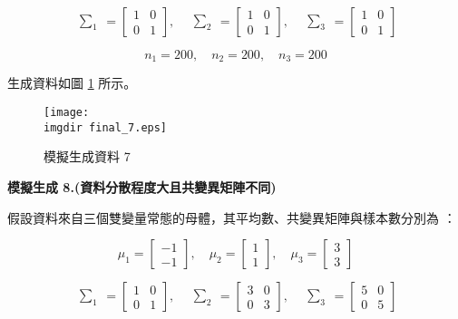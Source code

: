 \[\begin{matrix} \sum_{1} \end{matrix} = \begin{bmatrix}
1 & 0\\
0 & 1
\end{bmatrix}, \quad \begin{matrix} \sum_{2} \end{matrix} = \begin{bmatrix}
1 & 0\\
0 & 1
\end{bmatrix}, \quad \begin{matrix} \sum_{3} \end{matrix} = \begin{bmatrix}
1 & 0\\
0 & 1
\end{bmatrix}\]

\[n_1 = 200, \quad n_2 = 200, \quad n_3 = 200\]

生成資料如圖 \ref{fig:final_7} 所示。
\begin{figure}[H]
    \centering
        \texttt{[image: \\imgdir final\_7.eps]}
    \caption{模擬生成資料 7}
    \label{fig:final_7}
\end{figure}

\textbf{\large 模擬生成 8.(資料分散程度大且共變異矩陣不同)}

假設資料來自三個雙變量常態的母體，其平均數、共變異矩陣與樣本數分別為 ：

\[\mu_1 = \begin{bmatrix}
-1 \\
-1
\end{bmatrix}, \quad \mu_2 = \begin{bmatrix}
1 \\
1
\end{bmatrix}, \quad \mu_3 = \begin{bmatrix}
3 \\
3
\end{bmatrix}\]

\[\begin{matrix} \sum_{1} \end{matrix} = \begin{bmatrix}
1 & 0\\
0 & 1
\end{bmatrix}, \quad \begin{matrix} \sum_{2} \end{matrix} = \begin{bmatrix}
3 & 0\\
0 & 3
\end{bmatrix}, \quad \begin{matrix} \sum_{3} \end{matrix} = \begin{bmatrix}
5 & 0\\
0 & 5
\end{bmatrix}\]

